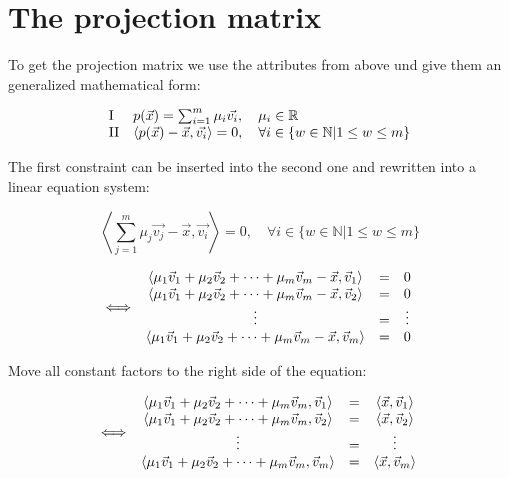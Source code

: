 \documentclass{article}
\newcommand{\rz}[1]{\ensuremath{\mathord{\mathrm{#1}}}}
\newcommand{\lrangle}[1]{\left\langle #1 \right\rangle}
\begin{document}
\section{The projection matrix}
To get the projection matrix we use the attributes from above und give them an generalized
mathematical form:

	\begin{equation}
		\begin{array}{l l}
			\rz{I}  &
			p(\vec{x}) = \sum_{i=1}^{m}{\mu _i\vec{v_i}}, \quad \mu _i \in \mathbb{R} \\
			\rz{II} &
			\lrangle{ p(\vec{x}) - \vec{x}, \vec{v_i} } = 0, \quad \forall i \in \{ w \in
			  \mathbb{N} | 1 \leq w \leq m \}
		\end{array}
	\end{equation}

The first constraint can be inserted into the second one and rewritten into a linear equation
system:

	\begin{equation}
		\lrangle{ \sum_{j=1}^{m}{\mu _j\vec{v_j}} - \vec{x}, \vec{v_i} } = 0, \quad \forall
		i \in \{ w \in \mathbb{N} | 1 \leq w \leq m \}
	\end{equation}

	\begin{equation}
		\iff
		\begin{array}{c c c}
			\lrangle{ \mu _1 \vec{v}_1 + \mu _2 \vec{v}_2 + \cdots + \mu _m \vec{v}_m - \vec{x},
			  \vec{v}_1 } &
			= &
			0 \\
			\lrangle{ \mu _1 \vec{v}_1 + \mu _2 \vec{v}_2 + \cdots + \mu _m \vec{v}_m - \vec{x},
			  \vec{v}_2 } &
			= &
			0 \\
			\vdots &
			= &
			\vdots \\
			\lrangle{ \mu _1 \vec{v}_1 + \mu _2 \vec{v}_2 + \cdots + \mu _m \vec{v}_m - \vec{x},
			  \vec{v}_m } &
			= &
			0
		\end{array}
	\end{equation}

Move all constant factors to the right side of the equation:

	\begin{equation}
		\iff
		\begin{array}{c c c}
			\lrangle{ \mu _1 \vec{v}_1 + \mu _2 \vec{v}_2 + \cdots + \mu _m \vec{v}_m,
			  \vec{v}_1 } & = & \lrangle{ \vec{x}, \vec{v}_1 } \\
			\lrangle{ \mu _1 \vec{v}_1 + \mu _2 \vec{v}_2 + \cdots + \mu _m \vec{v}_m,
			  \vec{v}_2 } & = & \lrangle{ \vec{x}, \vec{v}_2 } \\
			\vdots & = & \vdots \\
			\lrangle{ \mu _1 \vec{v}_1 + \mu _2 \vec{v}_2 + \cdots + \mu _m \vec{v}_m,
			  \vec{v}_m } & = & \lrangle{ \vec{x}, \vec{v}_m }
		\end{array}
	\end{equation}
\end{document}
